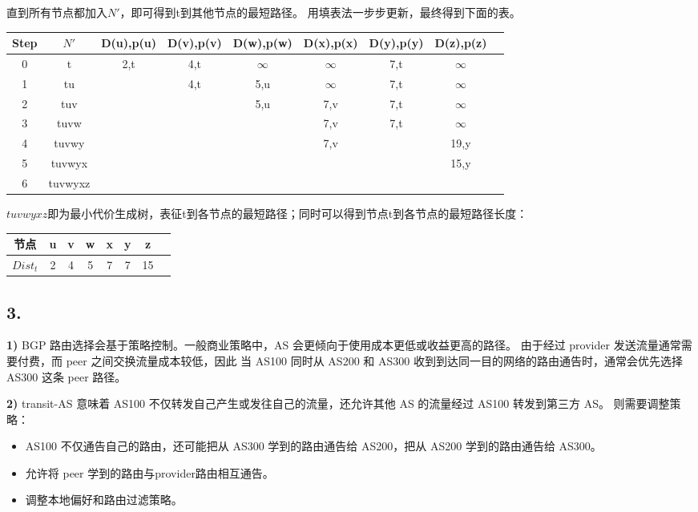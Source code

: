 \documentclass[11pt]{article}
\begin{document}
直到所有节点都加入$N'$，即可得到t到其他节点的最短路径。
用填表法一步步更新，最终得到下面的表。
\begin{table}[!htbp]
    \centering
    \renewcommand{\arraystretch}{1.2}
    \begin{tabular}{c c c c c c c c c}
        \toprule
        Step & $N'$ & D(u),p(u) & D(v),p(v) & D(w),p(w) & D(x),p(x) & D(y),p(y) & D(z),p(z) \\
        \midrule
        0 & t & 2,t & 4,t & $\infty$ & $\infty$ & 7,t & $\infty$ \\
        1 & tu & & 4,t & 5,u & $\infty$ & 7,t & $\infty$ \\
        2 & tuv & & & 5,u & 7,v & 7,t & $\infty$ \\
        3 & tuvw & & & & 7,v & 7,t & $\infty$ \\
        4 & tuvwy & & & & 7,v & & 19,y \\
        5 & tuvwyx & & & & & & 15,y \\
        6 & tuvwyxz & & & & & & \\
        \bottomrule
    \end{tabular}
\end{table}

$tuvwyxz$即为最小代价生成树，表征t到各节点的最短路径；同时可以得到节点t到各节点的最短路径长度：
\begin{table}[!htbp]
    \centering
    \renewcommand{\arraystretch}{1.2}
    \begin{tabular}{c c c c c c c c}
        \toprule
        节点 & u & v & w & x & y & z \\
        \midrule
        $Dist_t$ & 2 & 4 & 5 & 7 & 7 & 15 \\
        \bottomrule
    \end{tabular}
\end{table}

\subsection*{3. }
\textbf{1) }BGP 路由选择会基于策略控制。一般商业策略中，AS 会更倾向于使用成本更低或收益更高的路径。
由于经过 provider 发送流量通常需要付费，而 peer 之间交换流量成本较低，因此
当 AS100 同时从 AS200 和 AS300 收到到达同一目的网络的路由通告时，通常会优先选择 AS300 这条 peer 路径。

\textbf{2) }transit-AS 意味着 AS100 不仅转发自己产生或发往自己的流量，还允许其他 AS 的流量经过 AS100 转发到第三方 AS。
则需要调整策略：
\begin{itemize}
    \item AS100 不仅通告自己的路由，还可能把从 AS300 学到的路由通告给 AS200，把从 AS200 学到的路由通告给 AS300。
    \item 允许将 peer 学到的路由与provider路由相互通告。
    \item 调整本地偏好和路由过滤策略。
\end{itemize}
\end{document}
